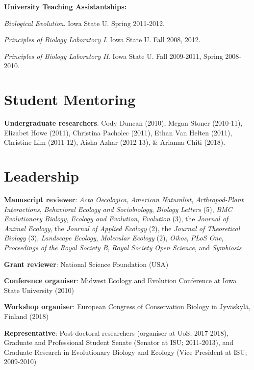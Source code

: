 \documentclass[letterpaper]{article}
\renewenvironment{itemize}{
  \begin{list}{}{
    \setlength{\leftmargin}{1.5em}
  }
}{
  \end{list}
}
\begin{document}
\begin{small}
\begin{itemize}
\item {\bf University Teaching Assistantships:}
\begin{itemize}
\item[$\bullet$]{{\it Biological Evolution}. Iowa State U. Spring 2011-2012.}
\item[$\bullet$]{{\it Principles of Biology Laboratory I}. Iowa State U. Fall 2008, 2012.}
\item[$\bullet$]{{\it Principles of Biology Laboratory II}. Iowa State U. Fall 2009-2011, Spring 2008-2010.}
\end{itemize}

\end{itemize}

\section*{Student Mentoring}
\begin{itemize}
\item {\bf Undergraduate researchers}. Cody Duncan (2010), Megan Stoner (2010-11), Elizabet Howe (2011), Christina Pacholec (2011), Ethan Van Helten (2011), Christine Lim (2011-12), Aisha Azhar (2012-13), \& Arianna Chiti (2018).
\end{itemize}

\section*{Leadership}
\begin{itemize}
\item {\bf Manuscript reviewer}: {\it Acta Oecologica}, {\it American Naturalist}, {\it Arthropod-Plant Interactions}, {\it Behavioral Ecology and Sociobiology}, {\it Biology Letters} (5), {\it BMC Evolutionary Biology}, {\it Ecology and Evolution}, {\it Evolution} (3), the {\it Journal of Animal Ecology}, the {\it Journal of Applied Ecology} (2), the {\it Journal of Theoretical Biology} (3), {\it Landscape Ecology}, {\it Molecular Ecology} (2), {\it Oikos}, {\it PLoS One}, {\it Proceedings of the Royal Society B}, {\it Royal Society Open Science}, and {\it Symbiosis}
\item {\bf Grant reviewer}: National Science Foundation (USA) 
\item {\bf Conference organiser}: Midwest Ecology and Evolution Conference at Iowa State University (2010)
\item {\bf Workshop organiser}: European Congress of Conservation Biology in Jyv\"{a}skyl\"{a}, Finland (2018)
\item {\bf Representative}: Post-doctoral researchers (organiser at UoS; 2017-2018), Graduate and Professional Student Senate (Senator at ISU; 2011-2013), and Graduate Research in Evolutionary Biology and Ecology (Vice President at ISU; 2009-2010)
\end{itemize}


\end{small}
\end{document}
